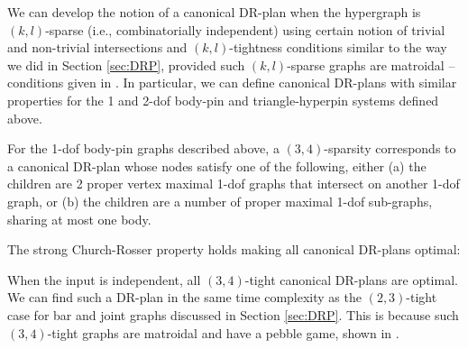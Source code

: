 We can develop the notion of a canonical DR-plan when the hypergraph is
$(k,l)$-sparse (i.e., combinatorially independent) using certain
notion of trivial and non-trivial intersections and
$(k,l)$-tightness conditions similar to the way we did in Section
\ref{sec:DRP}, provided
    such $(k,l)$-sparse graphs are matroidal -- conditions given in \cite{Lee:2007:PGA}.
    In particular, we can define canonical DR-plans with similar properties
    for the 1 and 2-dof body-pin and triangle-hyperpin systems defined
    above.

\begin{observation}
\label{obs:bodypin_drp}
    For the 1-dof body-pin graphs described above, a $(3,4)$-sparsity corresponds to a canonical DR-plan whose nodes satisfy one of the following, either
    (a) the children are 2 proper vertex maximal 1-dof graphs that intersect on another 1-dof graph, or
    (b) the children are a number of proper maximal 1-dof sub-graphs, sharing at most one body.
\end{observation}



The strong Church-Rosser property holds making all canonical DR-plans
optimal:
%
\begin{remark}\label{rem:1dofcanon}
    When the input is independent,
    all $(3,4)$-tight canonical DR-plans are optimal. We can find such a
    DR-plan in the same time complexity as the $(2,3)$-tight case for bar
    and joint graphs discussed in Section \ref{sec:DRP}.
    This is because
    such $(3,4)$-tight graphs are matroidal and have a pebble game, shown in \cite{Lee:2007:PGA}.
\end{remark}

